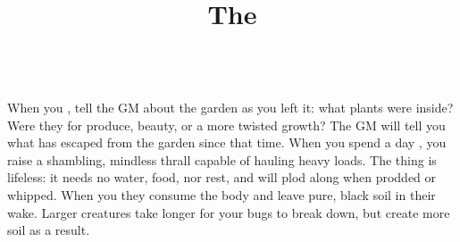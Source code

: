 \documentclass[darkmode]{dw_playbook}
\title{The \playbook}
\begin{document}
\pageOne
    {
    }
    {
        \looks

        \vspace{1mm}
        \race\\
            {When you , tell the GM about the garden as you left it: what plants were inside?  Were they for produce, beauty, or a more twisted growth?  The GM will tell you what has escaped from the garden since that time.}
            {When you spend a day , you raise a shambling, mindless thrall capable of hauling heavy loads.  The thing is lifeless: it needs no water, food, nor rest, and will plod along when prodded or whipped.}
            {When you  they consume the body and leave pure, black soil in their wake.  Larger creatures take longer for your bugs to break down, but create more soil as a result.}
    }
\end{document}
